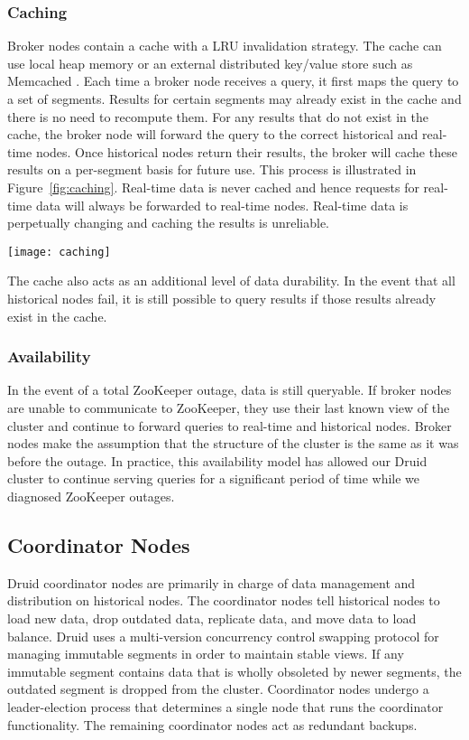 \documentclass{sig-alternate-2013}
\begin{document}
\subsubsection{Caching}
\label{sec:caching}
Broker nodes contain a cache with a LRU \cite{o1993lru, kim2001lrfu}
invalidation strategy. The cache can use local heap memory or an external
distributed key/value store such as Memcached
\cite{fitzpatrick2004distributed}. Each time a broker node receives a query, it
first maps the query to a set of segments. Results for certain segments may
already exist in the cache and there is no need to recompute them. For any
results that do not exist in the cache, the broker node will forward the query
to the correct historical and real-time nodes. Once historical nodes return
their results, the broker will cache these results on a per-segment basis for
future use. This process is illustrated in Figure~\ref{fig:caching}. Real-time
data is never cached and hence requests for real-time data will always be
forwarded to real-time nodes. Real-time data is perpetually changing and
caching the results is unreliable.

\begin{figure*}
\centering
\texttt{[image: caching]}
\caption{Results are cached per-segment. Queries combine cached results with results computed on historical and real-time nodes.}
\label{fig:caching}
\end{figure*}

The cache also acts as an additional level of data durability. In the event
that all historical nodes fail, it is still possible to query results if those
results already exist in the cache.

\subsubsection{Availability}
In the event of a total ZooKeeper outage, data is still queryable. If broker
nodes are unable to communicate to ZooKeeper, they use their last known view of
the cluster and continue to forward queries to real-time and historical nodes.
Broker nodes make the assumption that the structure of the cluster is the same
as it was before the outage. In practice, this availability model has allowed
our Druid cluster to continue serving queries for a significant period of time while we
diagnosed ZooKeeper outages.

\subsection{Coordinator Nodes}
Druid coordinator nodes are primarily in charge of data management and
distribution on historical nodes. The coordinator nodes tell historical nodes
to load new data, drop outdated data, replicate data, and move data to load
balance. Druid uses a multi-version concurrency control swapping protocol for
managing immutable segments in order to maintain stable views. If any
immutable segment contains data that is wholly obsoleted by newer segments, the
outdated segment is dropped from the cluster. Coordinator nodes undergo a
leader-election process that determines a single node that runs the coordinator
functionality. The remaining coordinator nodes act as redundant backups.
\end{document}
